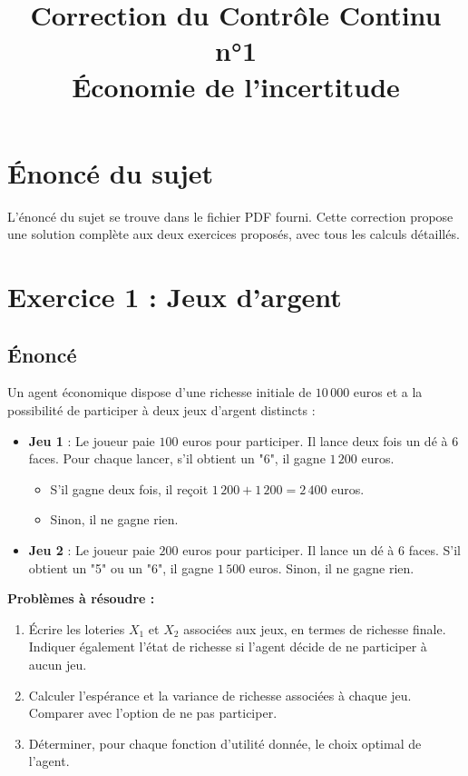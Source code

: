 \documentclass[12pt,a4paper]{article}
\title{Correction du Contrôle Continu n°1 \\ Économie de l'incertitude}
\author{}
\date{}
\begin{document}
	
	\maketitle
	
	\tableofcontents
	\newpage
	
	\section*{Énoncé du sujet}
	
	L'énoncé du sujet se trouve dans le fichier PDF fourni. Cette correction propose une solution complète aux deux exercices proposés, avec tous les calculs détaillés.
	
	\newpage
	
	\section{Exercice 1 : Jeux d'argent}
	
	\subsection{Énoncé}
	Un agent économique dispose d’une richesse initiale de \(10\,000\) euros et a la possibilité de participer à deux jeux d’argent distincts :
	\begin{itemize}
		\item \textbf{Jeu 1} : Le joueur paie \(100\) euros pour participer. Il lance deux fois un dé à \(6\) faces. Pour chaque lancer, s’il obtient un "6", il gagne \(1\,200\) euros. 
		\begin{itemize}
			\item S’il gagne deux fois, il reçoit \(1\,200 + 1\,200 = 2\,400\) euros.
			\item Sinon, il ne gagne rien.
		\end{itemize}
		\item \textbf{Jeu 2} : Le joueur paie \(200\) euros pour participer. Il lance un dé à \(6\) faces. S’il obtient un "5" ou un "6", il gagne \(1\,500\) euros. Sinon, il ne gagne rien.
	\end{itemize}
	
	\textbf{Problèmes à résoudre :}
	\begin{enumerate}
		\item Écrire les loteries \(X_1\) et \(X_2\) associées aux jeux, en termes de richesse finale. Indiquer également l'état de richesse si l'agent décide de ne participer à aucun jeu.
		\item Calculer l'espérance et la variance de richesse associées à chaque jeu. Comparer avec l'option de ne pas participer.
		\item Déterminer, pour chaque fonction d'utilité donnée, le choix optimal de l'agent.
	\end{enumerate}
	
\end{document}
